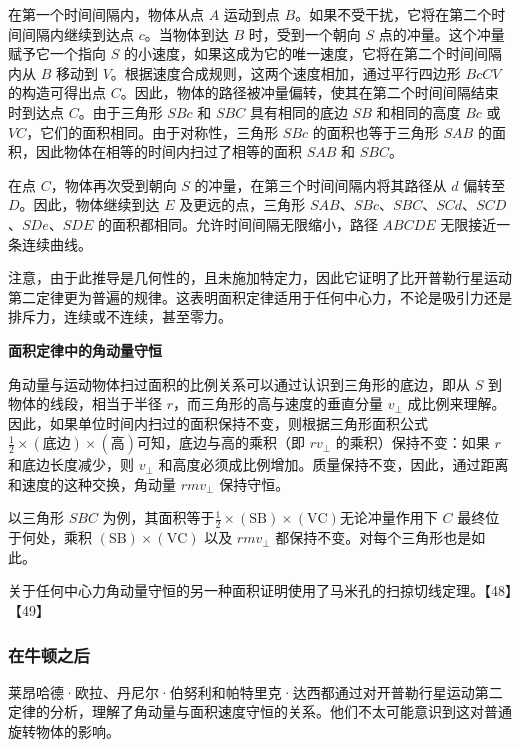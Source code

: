 在第一个时间间隔内，物体从点 \( A \) 运动到点 \( B \)。如果不受干扰，它将在第二个时间间隔内继续到达点 \( c \)。当物体到达 \( B \) 时，受到一个朝向 \( S \) 点的冲量。这个冲量赋予它一个指向 \( S \) 的小速度，如果这成为它的唯一速度，它将在第二个时间间隔内从 \( B \) 移动到 \( V \)。根据速度合成规则，这两个速度相加，通过平行四边形 \( BcCV \) 的构造可得出点 \( C \)。因此，物体的路径被冲量偏转，使其在第二个时间间隔结束时到达点 \( C \)。由于三角形 \( SBc \) 和 \( SBC \) 具有相同的底边 \( SB \) 和相同的高度 \( Bc \) 或 \( VC \)，它们的面积相同。由于对称性，三角形 \( SBc \) 的面积也等于三角形 \( SAB \) 的面积，因此物体在相等的时间内扫过了相等的面积 \( SAB \) 和 \( SBC \)。

在点 \( C \)，物体再次受到朝向 \( S \) 的冲量，在第三个时间间隔内将其路径从 \( d \) 偏转至 \( D \)。因此，物体继续到达 \( E \) 及更远的点，三角形 \( SAB \)、\( SBc \)、\( SBC \)、\( SCd \)、\( SCD \)、\( SDe \)、\( SDE \) 的面积都相同。允许时间间隔无限缩小，路径 \( ABCDE \) 无限接近一条连续曲线。

注意，由于此推导是几何性的，且未施加特定力，因此它证明了比开普勒行星运动第二定律更为普遍的规律。这表明面积定律适用于任何中心力，不论是吸引力还是排斥力，连续或不连续，甚至零力。

\textbf{面积定律中的角动量守恒}  

角动量与运动物体扫过面积的比例关系可以通过认识到三角形的底边，即从 \( S \) 到物体的线段，相当于半径 \( r \)，而三角形的高与速度的垂直分量 \( v_\perp \) 成比例来理解。因此，如果单位时间内扫过的面积保持不变，则根据三角形面积公式 \(\frac{1}{2} \times (\text{底边}) \times (\text{高})\)可知，底边与高的乘积（即 \( r v_\perp \) 的乘积）保持不变：如果 \( r \) 和底边长度减少，则 \( v_\perp \) 和高度必须成比例增加。质量保持不变，因此，通过距离和速度的这种交换，角动量 \( r m v_\perp \) 保持守恒。

以三角形 \( SBC \) 为例，其面积等于\(\frac{1}{2} \times (\text{SB}) \times (\text{VC})\)无论冲量作用下 \( C \) 最终位于何处，乘积 \( (\text{SB}) \times (\text{VC}) \) 以及 \( r m v_\perp \) 都保持不变。对每个三角形也是如此。

关于任何中心力角动量守恒的另一种面积证明使用了马米孔的扫掠切线定理。【48】【49】
\subsubsection{在牛顿之后}  
莱昂哈德·欧拉、丹尼尔·伯努利和帕特里克·达西都通过对开普勒行星运动第二定律的分析，理解了角动量与面积速度守恒的关系。他们不太可能意识到这对普通旋转物体的影响。


